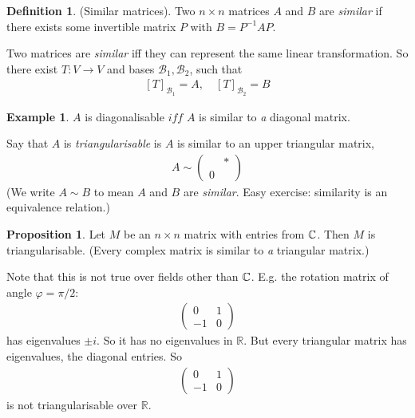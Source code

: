 \documentclass{article}
\theoremstyle{definition} \newtheorem*{definition}{Definition}
\newtheorem{proposition}[theorem]{Proposition}
\newtheorem*{exmp}{Example} \newtheorem*{exmps}{Examples}
\newcommand{\reals}{\mathbb{R}} \newcommand{\rationals}{\mathbb{Q}}
\begin{document}
\begin{definition}
  (Similar matrices). Two $n \times n$ matrices $A$ and $B$ are 
  \textit{similar} if there exists some invertible matrix $P$ with 
  $B=P^{-1}AP$.
\end{definition}

Two matrices are \textit{similar} iff they can represent the same 
linear transformation. So there exist $T : V \rightarrow V$ and 
bases $\mathcal{B}_1,\mathcal{B}_2$, such that
\begin{align*}
  \left[ T \right]_{\mathcal{B}_1}=A,\quad \left[ T \right]_{\mathcal{B}_2} = B
\end{align*}

\begin{exmp}
  $A$ is diagonalisable $iff$ $A$ is similar to \textit{a} diagonal matrix.
\end{exmp}

Say that $A$ is \textit{triangularisable} is $A$ is similar to an upper
triangular matrix,
\begin{align*}
  A \sim \left( 
  \begin{matrix}
    & *\\
    0 & 
  \end{matrix}
  \right)
\end{align*}
(We write $A \sim B$ to mean $A$ and $B$ are \textit{similar}. Easy 
exercise: similarity is an equivalence relation.)\\

\begin{proposition}
  Let $M$ be an $n \times n$ matrix with entries from $\mathbb{C}$.
  Then $M$ is triangularisable.
  \label{prp:triangularisable}
  (Every complex matrix is similar to \textit{a} triangular matrix.)

  Note that this is not true over fields other than $\mathbb{C}$. 
  E.g. the rotation matrix of angle $\varphi=\pi/2$:
  \begin{align*}
    \left( 
    \begin{matrix}
      0 & 1\\
      -1 & 0
    \end{matrix}
    \right)
  \end{align*}
  has eigenvalues $\pm i$. So it has no eigenvalues in $\reals$. But
  every triangular matrix has eigenvalues, the diagonal entries. So
  \begin{align*}
    \left( 
    \begin{matrix}
      0 & 1\\
      -1 & 0
    \end{matrix}
    \right)
  \end{align*}
  is not triangularisable over $\reals$.
\end{proposition}
\end{document}
